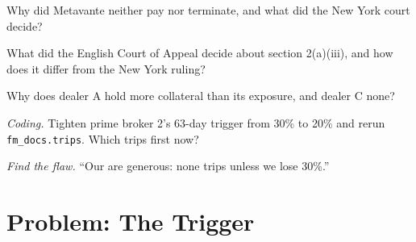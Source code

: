 \begin{exercise}[$\star\star$]\label{exo:fm:legal-documentation:4}
Why did Metavante neither pay nor terminate, and what did the New York court decide?
\end{exercise}

\begin{exercise}[$\star\star$]\label{exo:fm:legal-documentation:5}
What did the English Court of Appeal decide about section 2(a)(iii), and how does it differ from the New York ruling?
\end{exercise}

\begin{exercise}[$\star\star$]\label{exo:fm:legal-documentation:6}
Why does dealer A hold more collateral than its exposure, and dealer C none?
\end{exercise}

\begin{exercise}[$\star\star\star$]\label{exo:fm:legal-documentation:7}
\emph{Coding.} Tighten prime broker 2's 63-day trigger from 30\% to 20\% and rerun \texttt{fm\_docs.trips}. Which trips first now?
\end{exercise}

\begin{exercise}[$\star\star\star$]\label{exo:fm:legal-documentation:8}
\emph{Find the flaw.} ``Our  are generous: none trips unless we lose 30\%.''
\end{exercise}

\section{Problem: The Trigger}

